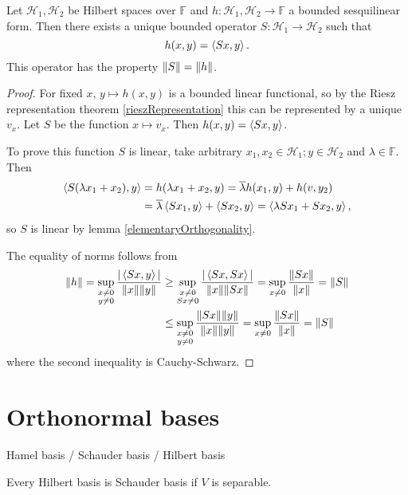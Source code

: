 \begin{proposition} \label{sesquilinearRepresentation}
Let $\mathcal{H}_1,\mathcal{H}_2$ be Hilbert spaces over $\mathbb{F}$ and $h:\mathcal{H}_1,\mathcal{H}_2\to\mathbb{F}$ a bounded sesquilinear form. Then there exists a unique bounded operator $S:\mathcal{H}_1 \to \mathcal{H}_2$ such that
\[ h(x,y) = \left\langle Sx,y \right\rangle. \]
This operator has the property $\lVert S\rVert = \lVert h\rVert$.
\end{proposition}
\begin{proof}
For fixed $x$, $y\mapsto h(x,y)$ is a bounded linear functional, so by the Riesz representation theorem \ref{rieszRepresentation} this can be represented by a unique $v_x$. Let $S$ be the function $x\mapsto v_x$. Then $h(x,y) = \left\langle Sx,y \right\rangle$.

To prove this function $S$ is linear, take arbitrary $x_1,x_2\in \mathcal{H}_1;y\in \mathcal{H}_2$ and $\lambda \in \mathbb{F}$. Then
\begin{align*}
\left\langle S(\lambda x_1+ x_2),y \right\rangle &= h(\lambda x_1+ x_2, y) = \overline{\lambda} h(x_1,y)+h(v,y_2) \\
&= \overline{\lambda} \left\langle Sx_1, y \right\rangle + \left\langle Sx_2, y \right\rangle = \left\langle \lambda Sx_1 + Sx_2,y \right\rangle,
\end{align*}
so $S$ is linear by lemma \ref{elementaryOrthogonality}.

The equality of norms follows from
\begin{align*}
\lVert h\rVert = \sup_{\substack{x\neq 0 \\ y\neq 0}}\frac{|\left\langle Sx,y \right\rangle|}{\lVert x\rVert\lVert y\rVert} &\geq \sup_{\substack{x\neq 0 \\ Sx\neq 0}}\frac{|\left\langle Sx,Sx \right\rangle|}{\lVert x\rVert\lVert Sx\rVert} = \sup_{x\neq 0}\frac{\lVert Sx\rVert}{\lVert x\rVert} = \lVert S\rVert \\
&\leq \sup_{\substack{x\neq 0 \\ y\neq 0}}\frac{\lVert Sx\rVert\lVert y\rVert}{\lVert x\rVert\lVert y\rVert} = \sup_{x\neq 0}\frac{\lVert Sx\rVert}{\lVert x\rVert} = \lVert S\rVert
\end{align*}
where the second inequality is Cauchy-Schwarz.
\end{proof}

\section{Orthonormal bases}

Hamel basis / Schauder basis / Hilbert basis

Every Hilbert basis is Schauder basis if $V$ is separable.

